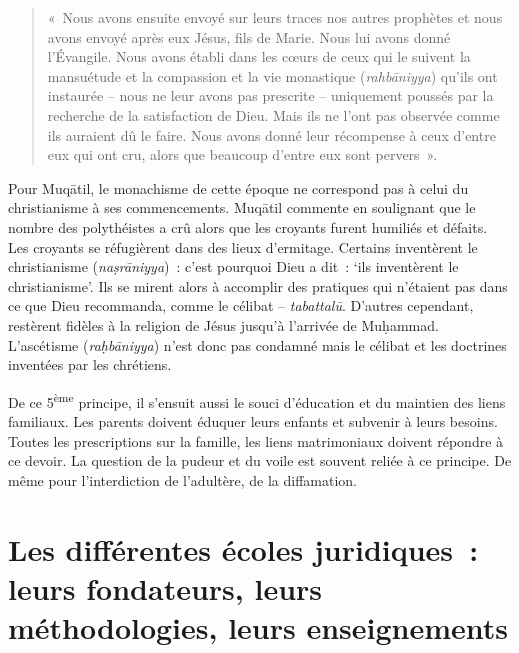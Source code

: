 \begin{quote}
 «~Nous avons ensuite envoyé sur leurs traces nos autres prophètes et
nous avons envoyé après eux Jésus, fils de Marie. Nous lui avons donné
l'Évangile. Nous avons établi dans les cœurs de ceux qui le suivent la
mansuétude et la compassion et la vie monastique (\emph{rahbāniyya})
qu'ils ont instaurée -- nous ne leur avons pas prescrite -- uniquement
poussés par la recherche de la satisfaction de Dieu. Mais ils ne l'ont
pas observée comme ils auraient dû le faire. Nous avons donné leur
récompense à ceux d'entre eux qui ont cru, alors que beaucoup d'entre
eux sont pervers~».

   
\end{quote}

Pour Muqātil, le monachisme de cette époque ne correspond pas à celui du
christianisme à ses commencements. Muqātil commente en soulignant que le nombre des
polythéistes a crû alors que les croyants furent humiliés et défaits.
Les croyants se réfugièrent dans des lieux d'ermitage. Certains
inventèrent le christianisme (\emph{naṣrāniyya})~: c'est pourquoi Dieu a
dit~: `ils inventèrent le christianisme'. Ils se mirent alors à
accomplir des pratiques qui n'étaient pas dans ce que Dieu recommanda,
comme le célibat -- \emph{tabattalū}. D'autres cependant, restèrent
fidèles à la religion de Jésus jusqu'à l'arrivée de Muḥammad.
L'ascétisme (\emph{raḥbāniyya}) n'est donc pas condamné mais le célibat
et les doctrines inventées par les chrétiens.

De ce 5\textsuperscript{ème} principe, il s'ensuit aussi le souci
d'éducation et du maintien des liens familiaux. Les parents doivent
éduquer leurs enfants et subvenir à leurs besoins. Toutes les
prescriptions sur la famille, les liens matrimoniaux doivent répondre à
ce devoir. La question de la pudeur et du voile est souvent reliée à ce
principe. De même pour l'interdiction de l'adultère, de la diffamation.


\section[Les écoles Juridiques]{Les différentes écoles juridiques~: leurs
fondateurs, leurs méthodologies, leurs enseignements
}

